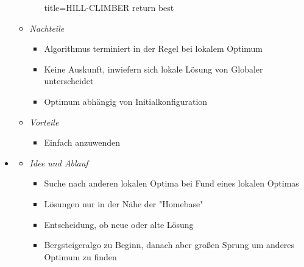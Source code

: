 \documentclass[
    12pt,
    a4paper,
    ngerman,
    color=3b,%
    marginpar=false,
    colorback=false,
    leqno,
]{tudaexercise}
\begin{document}
\begin{itemize}
\begin{itemize}
\begin{itemize}
\begin{ccode}[autogobble,fontsize=\small]{title={HILL-CLIMBER}}
                            return best
                            \end{ccode}
                    \end{itemize}
\pagebreak
                \item \textit{Nachteile}
                    \begin{itemize}
                        \item Algorithmus terminiert in der Regel bei lokalem Optimum
                        \item Keine Auskunft, inwiefern sich lokale Lösung von Globaler unterscheidet
                        \item Optimum abhängig von Initialkonfiguration
                    \end{itemize}
                \item \textit{Vorteile}
                    \begin{itemize}
                        \item Einfach anzuwenden
                    \end{itemize}
            \end{itemize}

        \item {}
            \begin{itemize}
                \item \textit{Idee und Ablauf}
                    \begin{itemize}
                        \item Suche nach anderen lokalen Optima bei Fund eines lokalen Optimas
                        \item Lösungen nur in der Nähe der \string"Homebase\string"
                        \item Entscheidung, ob neue oder alte Lösung
                        \item Bergsteigeralgo zu Beginn, danach aber großen Sprung um anderes Optimum zu finden
                    \end{itemize}


\end{itemize}
\end{itemize}
\end{document}
